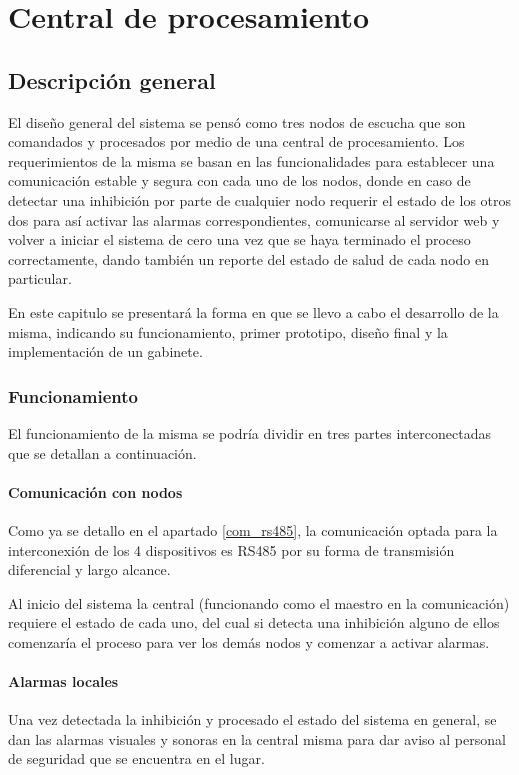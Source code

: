 \chapter{Central de procesamiento}
\section{Descripción general}
\par El diseño general del sistema se pensó como tres nodos de escucha que son comandados y
procesados por medio de una central de procesamiento. Los requerimientos de la misma se
basan en las funcionalidades para establecer una comunicación estable y segura con cada uno
de los nodos, donde en caso de detectar una inhibición por parte de cualquier nodo requerir
el estado de los otros dos para así activar las alarmas correspondientes, comunicarse al
servidor web y volver a iniciar el sistema de cero una vez que se haya terminado el proceso
correctamente, dando también un reporte del estado de salud de cada nodo en particular.
\par En este capitulo se presentará la forma en que se llevo a cabo el desarrollo de la
misma, indicando su funcionamiento, primer prototipo, diseño final y la implementación de
un gabinete. 
\subsection{Funcionamiento}
\par El funcionamiento de la misma se podría dividir en tres partes interconectadas que se detallan 
a continuación.
\subsubsection{Comunicación con nodos}
\par Como ya se detallo en el apartado \ref{com_rs485}, la comunicación optada para la interconexión 
de los 4 dispositivos es RS485 por su forma de transmisión diferencial y largo alcance. 
\par Al inicio del sistema la central (funcionando como el maestro en la comunicación) requiere 
el estado de cada uno, del cual si detecta una inhibición alguno de ellos comenzaría el proceso 
para ver los demás nodos y comenzar a activar alarmas.

\subsubsection{Alarmas locales}
\par Una vez detectada la inhibición y procesado el estado del sistema en general, se dan las 
alarmas visuales y sonoras en la central misma para dar aviso al personal de seguridad que se 
encuentra en el lugar. 


